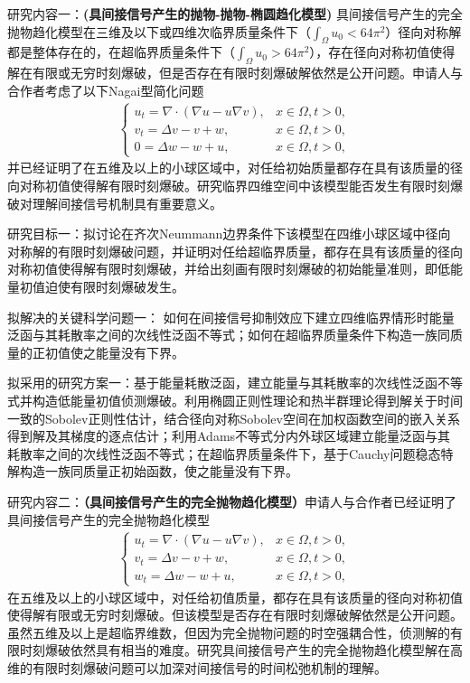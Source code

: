 \documentclass[12pt]{article}
\begin{document}
研究内容一：\textbf{(具间接信号产生的抛物-抛物-椭圆趋化模型)}
具间接信号产生的完全抛物趋化模型在三维及以下或四维次临界质量条件下（$\int_\Omega u_0< 64\pi^2$）径向对称解都是整体存在的，在超临界质量条件下（$\int_\Omega u_0> 64\pi^2$），存在径向对称初值使得解在有限或无穷时刻爆破，但是否存在有限时刻爆破解依然是公开问题。申请人与合作者考虑了以下Nagai型简化问题
\begin{align}
    \begin{cases}
      \label{sys: ks isp ppe}
        u_t =  \nabla\cdot(\nabla u - u\nabla v),& x\in\Omega, t>0,\\
        v_t =  \Delta v - v + w,& x\in\Omega,	 t>0,\\
        0   = \Delta w - w + u, & x\in\Omega, t > 0, 
    \end{cases}
\end{align}
并已经证明了在五维及以上的小球区域中，对任给初始质量都存在具有该质量的径向对称初值使得解有限时刻爆破。研究临界四维空间中该模型能否发生有限时刻爆破对理解间接信号机制具有重要意义。

研究目标一：拟讨论在齐次Neummann边界条件下该模型在四维小球区域中径向对称解的有限时刻爆破问题，并证明对任给超临界质量，都存在具有该质量的径向对称初值使得解有限时刻爆破，并给出刻画有限时刻爆破的初始能量准则，即低能量初值迫使有限时刻爆破发生。

拟解决的关键科学问题一：
如何在间接信号抑制效应下建立四维临界情形时能量泛函与其耗散率之间的次线性泛函不等式；如何在超临界质量条件下构造一族同质量的正初值使之能量没有下界。

拟采用的研究方案一：基于能量耗散泛函，建立能量与其耗散率的次线性泛函不等式并构造低能量初值侦测爆破。利用椭圆正则性理论和热半群理论得到解关于时间一致的Sobolev正则性估计，结合径向对称Sobolev空间在加权函数空间的嵌入关系得到解及其梯度的逐点估计；利用Adams不等式分内外球区域建立能量泛函与其耗散率之间的次线性泛函不等式；在超临界质量条件下，基于Cauchy问题稳态特解构造一族同质量正初始函数，使之能量没有下界。

研究内容二：\textbf{（具间接信号产生的完全抛物趋化模型）}申请人与合作者已经证明了具间接信号产生的完全抛物趋化模型
\begin{align}
    \begin{cases}
      \label{sys: ks isp ppp}
        u_t =  \nabla\cdot(\nabla u - u\nabla v),& x\in\Omega, t>0,\\
        v_t =  \Delta v - v + w,& x\in\Omega,	 t>0,\\
        w_t  = \Delta w - w + u, & x\in\Omega, t > 0, 
    \end{cases}
\end{align}
在五维及以上的小球区域中，对任给初值质量，都存在具有该质量的径向对称初值使得解有限或无穷时刻爆破。但该模型是否存在有限时刻爆破解依然是公开问题。虽然五维及以上是超临界维数，但因为完全抛物问题的时空强耦合性，侦测解的有限时刻爆破依然具有相当的难度。研究具间接信号产生的完全抛物趋化模型解在高维的有限时刻爆破问题可以加深对间接信号的时间松弛机制的理解。
\end{document}
